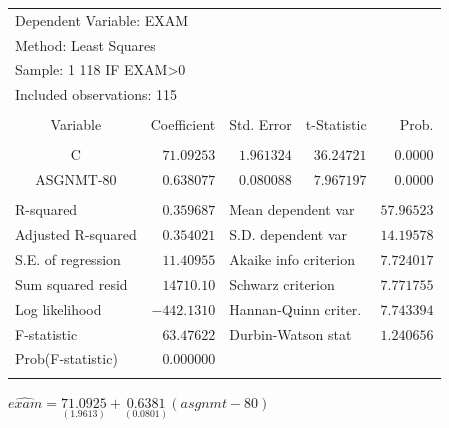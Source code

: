 \documentclass[12pt]{report}
\begin{document}
\begin{table}[H]
	\centering
	\begin{tabular}{lrrrr}
		\multicolumn{3}{l}{Dependent Variable: EXAM}&\multicolumn{1}{c}{}&\multicolumn{1}{c}{}\\
		\multicolumn{3}{l}{Method: Least Squares}&\multicolumn{1}{c}{}&\multicolumn{1}{c}{}\\
		\multicolumn{3}{l}{Sample: 1 118 IF EXAM\textgreater 0}&\multicolumn{1}{c}{}&\multicolumn{1}{c}{}\\
		\multicolumn{3}{l}{Included observations: 115}&\multicolumn{1}{c}{}&\multicolumn{1}{c}{}\\
		[4.5pt] \hline \\ [-4.5pt]
		\multicolumn{1}{c}{Variable}&\multicolumn{1}{r}{Coefficient}&\multicolumn{1}{r}{Std. Error}&\multicolumn{1}{r}{t-Statistic}&\multicolumn{1}{r}{Prob.}\\
		[4.5pt] \hline \\ [-4.5pt]
		\multicolumn{1}{c}{C}&\multicolumn{1}{r}{$71.09253$}&\multicolumn{1}{r}{$1.961324$}&\multicolumn{1}{r}{$36.24721$}&\multicolumn{1}{r}{$0.0000$}\\
		\multicolumn{1}{c}{ASGNMT-80}&\multicolumn{1}{r}{$0.638077$}&\multicolumn{1}{r}{$0.080088$}&\multicolumn{1}{r}{$7.967197$}&\multicolumn{1}{r}{$0.0000$}\\
		[4.5pt] \hline \\ [-4.5pt]
		\multicolumn{1}{l}{R-squared}&\multicolumn{1}{r}{$0.359687$}&\multicolumn{2}{l}{Mean dependent var}&\multicolumn{1}{r}{$57.96523$}\\
		\multicolumn{1}{l}{Adjusted R-squared}&\multicolumn{1}{r}{$0.354021$}&\multicolumn{2}{l}{S.D. dependent var}&\multicolumn{1}{r}{$14.19578$}\\
		\multicolumn{1}{l}{S.E. of regression}&\multicolumn{1}{r}{$11.40955$}&\multicolumn{2}{l}{Akaike info criterion}&\multicolumn{1}{r}{$7.724017$}\\
		\multicolumn{1}{l}{Sum squared resid}&\multicolumn{1}{r}{$14710.10$}&\multicolumn{2}{l}{Schwarz criterion}&\multicolumn{1}{r}{$7.771755$}\\
		\multicolumn{1}{l}{Log likelihood}&\multicolumn{1}{r}{$-442.1310$}&\multicolumn{2}{l}{Hannan-Quinn criter.}&\multicolumn{1}{r}{$7.743394$}\\
		\multicolumn{1}{l}{F-statistic}&\multicolumn{1}{r}{$63.47622$}&\multicolumn{2}{l}{Durbin-Watson stat}&\multicolumn{1}{r}{$1.240656$}\\
		\multicolumn{1}{l}{Prob(F-statistic)}&\multicolumn{1}{r}{$0.000000$}&\multicolumn{1}{c}{}&\multicolumn{1}{c}{}&\multicolumn{1}{c}{}\\
		[4.5pt] \hline \\ [-4.5pt]
	\end{tabular}
\end{table}
\vspace{-\baselineskip}
\centering $\widehat{exam} = \underset{(1.9613)}{71.0925} + \underset{(0.0801)}{0.6381}(asgnmt-80)$
\end{document}
